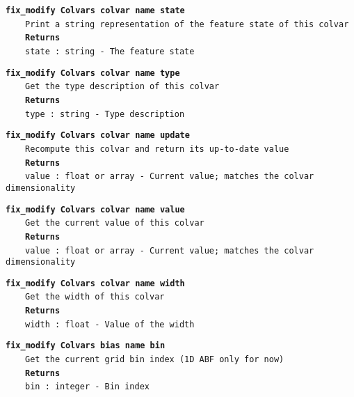 \begin{mdexampleinput}{}
\texttt{\textbf{fix\_modify Colvars colvar name state}}
\\
\-~~~~\texttt{Print a string representation of the feature state of this colvar}
\\
\-~~~~\texttt{\textbf{Returns}}
\\
\-~~~~\texttt{state : string - The feature state}
\end{mdexampleinput}
\begin{mdexampleinput}{}
\texttt{\textbf{fix\_modify Colvars colvar name type}}
\\
\-~~~~\texttt{Get the type description of this colvar}
\\
\-~~~~\texttt{\textbf{Returns}}
\\
\-~~~~\texttt{type : string - Type description}
\end{mdexampleinput}
\begin{mdexampleinput}{}
\texttt{\textbf{fix\_modify Colvars colvar name update}}
\\
\-~~~~\texttt{Recompute this colvar and return its up-to-date value}
\\
\-~~~~\texttt{\textbf{Returns}}
\\
\-~~~~\texttt{value : float or array - Current value; matches the colvar dimensionality}
\end{mdexampleinput}
\begin{mdexampleinput}{}
\texttt{\textbf{fix\_modify Colvars colvar name value}}
\\
\-~~~~\texttt{Get the current value of this colvar}
\\
\-~~~~\texttt{\textbf{Returns}}
\\
\-~~~~\texttt{value : float or array - Current value; matches the colvar dimensionality}
\end{mdexampleinput}
\begin{mdexampleinput}{}
\texttt{\textbf{fix\_modify Colvars colvar name width}}
\\
\-~~~~\texttt{Get the width of this colvar}
\\
\-~~~~\texttt{\textbf{Returns}}
\\
\-~~~~\texttt{width : float - Value of the width}
\end{mdexampleinput}
\begin{mdexampleinput}{}
\texttt{\textbf{fix\_modify Colvars bias name bin}}
\\
\-~~~~\texttt{Get the current grid bin index (1D ABF only for now)}
\\
\-~~~~\texttt{\textbf{Returns}}
\\
\-~~~~\texttt{bin : integer - Bin index}
\end{mdexampleinput}
